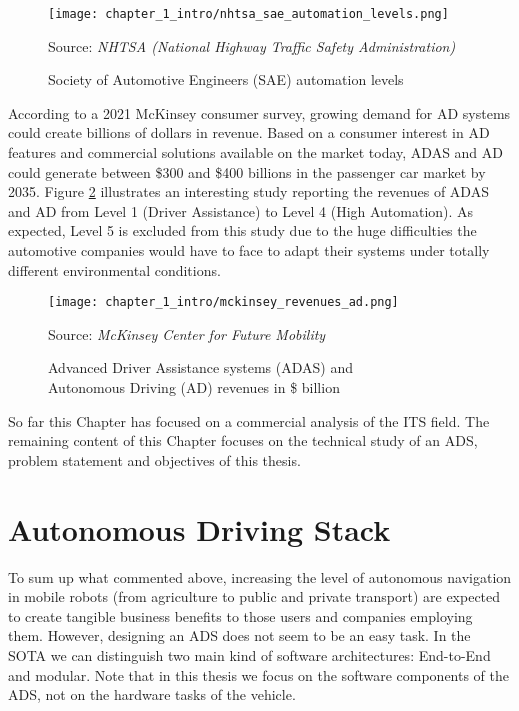 \begin{figure}[h]
	\centering
	\texttt{[image: chapter\_1\_intro/nhtsa\_sae\_automation\_levels.png]}
	\caption{Society of Automotive Engineers (SAE) automation levels}
    Source: \textit{NHTSA (National Highway Traffic Safety Administration)}
	\label{fig:chapter_1_intro/nhtsa_sae_automation_levels}
\end{figure}


According to a 2021 McKinsey consumer survey, growing demand for \ac{AD} systems could create billions of dollars in revenue. Based on a consumer interest in \ac{AD} features and commercial solutions available on the market today, ADAS and AD could generate between \$300 and \$400 billions in the passenger car market by 2035. Figure \ref{fig:chapter_1_intro/mckinsey_revenues_ad} illustrates an interesting study reporting the revenues of ADAS and AD from Level 1 (Driver Assistance) to Level 4 (High Automation). As expected, Level 5 is excluded from this study due to the huge difficulties the automotive companies would have to face to adapt their systems under totally different environmental conditions.

\begin{figure}[h]
	\centering
	\texttt{[image: chapter\_1\_intro/mckinsey\_revenues\_ad.png]}
	\caption{Advanced Driver Assistance systems (ADAS) and \\ Autonomous Driving (AD) revenues in \$ billion} Source: \textit{McKinsey Center for Future Mobility}
	\label{fig:chapter_1_intro/mckinsey_revenues_ad}
\end{figure}

So far this Chapter has focused on a commercial analysis of the \ac{ITS} field. The remaining content of this Chapter focuses on the technical study of an \ac{ADS}, problem statement and objectives of this thesis.

\section{Autonomous Driving Stack}
\label{sec:1_ad_architecture}

To sum up what commented above, increasing the level of autonomous navigation in mobile robots (from agriculture to public and private transport) are expected to create tangible business benefits to those users and companies employing them. However, designing an \ac{ADS} does not seem to be an easy task. In the \ac{SOTA} we can distinguish two main kind of software architectures: End-to-End and modular. Note that in this thesis we focus on the software components of the \ac{ADS}, not on the hardware tasks of the vehicle. 

